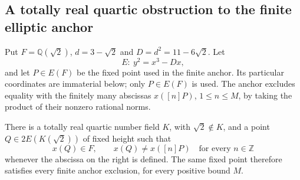 \subsection{A totally real quartic obstruction to the finite elliptic anchor}

Put $F=\mathbb Q(\sqrt2)$, $d=3-\sqrt2$ and
$D=d^2=11-6\sqrt2$.  Let
\[
                         E:\ y^2=x^3-Dx,
\]
and let $P\in E(F)$ be the fixed point used in the finite
anchor.  Its particular coordinates are immaterial below;
only $P\in E(F)$ is used.  The anchor excludes equality with
the finitely many abscissas $x([n]P)$, $1\le n\le M$, by
taking the product of their nonzero rational norms.

\begin{proposition}\label{prop:totally-real-anchor-counterexample-phase3}
There is a totally real quartic number field $K$, with
$\sqrt2\notin K$, and a point $Q\in2E(K(\sqrt2))$ of
fixed height such that
\[
              x(Q)\in F,\qquad x(Q)\ne x([n]P)
                       \quad\text{for every }n\in\mathbb Z
\]
whenever the abscissa on the right is defined.  The same fixed
point therefore satisfies every finite anchor exclusion, for
every positive bound $M$.
\end{proposition}
